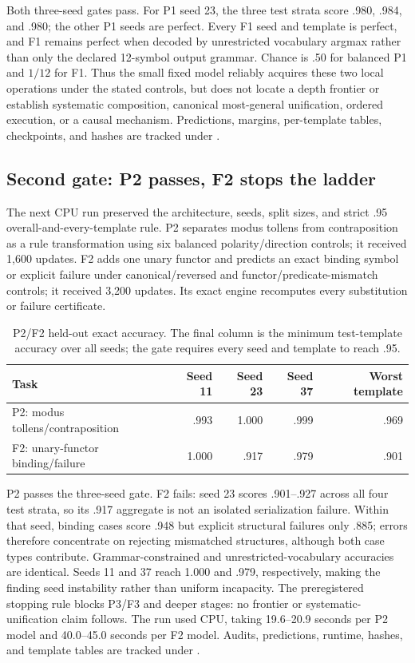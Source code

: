 \documentclass[10pt]{article}
\begin{document}
Both three-seed gates pass. For P1 seed 23, the three test strata score .980,
.984, and .980; the other P1 seeds are perfect. Every F1 seed and template is
perfect, and F1 remains perfect when decoded by unrestricted vocabulary argmax rather
than only the declared 12-symbol output grammar. Chance is .50 for balanced P1 and
$1/12$ for F1. Thus the small fixed model reliably acquires these two local operations
under the stated controls, but does not locate a depth frontier or establish systematic
composition, canonical most-general unification, ordered execution, or a causal
mechanism. Predictions, margins, per-template
tables, checkpoints, and hashes are tracked under .

\subsection{Second gate: P2 passes, F2 stops the ladder}
The next CPU run preserved the architecture, seeds, split sizes, and strict .95
overall-and-every-template rule. P2 separates modus tollens from contraposition as a
rule transformation using six balanced polarity/direction controls; it received 1,600
updates. F2 adds one unary functor and predicts an exact binding symbol or explicit
failure under canonical/reversed and functor/predicate-mismatch controls; it received
3,200 updates. Its exact engine recomputes every substitution or failure certificate.

\begin{table}[H]
\centering
\caption{P2/F2 held-out exact accuracy. The final column is the minimum test-template
accuracy over all seeds; the gate requires every seed and template to reach .95.}
\begin{tabular}{lrrrr}
\toprule
Task & Seed 11 & Seed 23 & Seed 37 & Worst template\\
\midrule
P2: modus tollens/contraposition & .993 & 1.000 & .999 & .969\\
F2: unary-functor binding/failure & 1.000 & .917 & .979 & .901\\
\bottomrule
\end{tabular}
\end{table}

P2 passes the three-seed gate. F2 fails: seed 23 scores .901--.927 across all four
test strata, so its .917 aggregate is not an isolated serialization failure. Within
that seed, binding cases score .948 but explicit structural failures only .885; errors
therefore concentrate on rejecting mismatched structures, although both case types
contribute. Grammar-constrained and unrestricted-vocabulary accuracies are identical.
Seeds 11 and 37 reach 1.000 and .979, respectively, making the finding seed instability
rather than uniform incapacity. The preregistered stopping rule blocks P3/F3 and deeper
stages: no frontier or systematic-unification claim follows. The run used CPU, taking
19.6--20.9 seconds per P2 model and 40.0--45.0 seconds per F2 model. Audits, predictions,
runtime, hashes, and template tables are tracked under .
\end{document}
